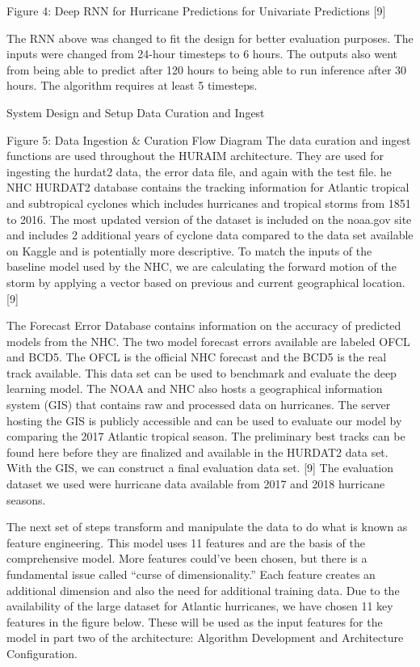 \documentclass{article}
\begin{document}
Figure 4: Deep RNN for Hurricane Predictions for Univariate Predictions [9]

The RNN above was changed to fit the design for better evaluation purposes. The inputs were changed from 24-hour timesteps to 6 hours. The outputs also went from being able to predict after 120 hours to being able to run inference after 30 hours. The algorithm requires at least 5 timesteps. 

System Design and Setup
Data Curation and Ingest


Figure 5: Data Ingestion & Curation Flow Diagram
The data curation and ingest functions are used throughout the HURAIM architecture. They are used for ingesting the hurdat2 data, the error data file, and again with the test file. he NHC HURDAT2 database contains the tracking information for Atlantic tropical and subtropical cyclones which includes hurricanes and tropical storms from 1851 to 2016. The most updated version of the dataset is included on the noaa.gov site and includes 2 additional years of cyclone data compared to the data set available on Kaggle and is potentially more descriptive. To match the inputs of the baseline model used by the NHC, we are calculating the forward motion of the storm by applying a vector based on previous and current geographical location.  [9]

The Forecast Error Database contains information on the accuracy of predicted models from the NHC. The two model forecast errors available are labeled OFCL and BCD5. The OFCL is the official NHC forecast and the BCD5 is the real track available. This data set can be used to benchmark and evaluate the deep learning model. The NOAA and NHC also hosts a geographical information system (GIS) that contains raw and processed data on hurricanes. The server hosting the GIS is publicly accessible and can be used to evaluate our model by comparing the 2017 Atlantic tropical season. The preliminary best tracks can be found here before they are finalized and available in the HURDAT2 data set. With the GIS, we can construct a final evaluation data set. [9] The evaluation dataset we used were hurricane data available from 2017 and 2018 hurricane seasons. 

The next set of steps transform and manipulate the data to do what is known as feature engineering. This model uses 11 features and are the basis of the comprehensive model. More features could’ve been chosen, but there is a fundamental issue called “curse of dimensionality.” Each feature creates an additional dimension and also the need for additional training data. Due to the availability of the large dataset for Atlantic hurricanes, we have chosen 11 key features in the figure below. These will be used as the input features for the model in part two of the architecture: Algorithm Development and Architecture Configuration.
\end{document}
